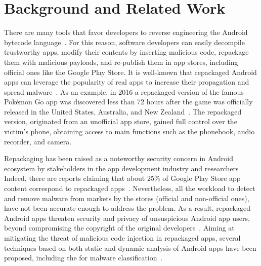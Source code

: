 \section{Background and Related Work}\label{sec:background}


There are many tools that favor developers to reverse engineering the Android bytecode language~\cite{DBLP:conf/issta/WangGMC15}.
For this reason, software developers can easily decompile trustworthy apps, modify their contents by inserting malicious code,
repackage them with malicious payloads, and re-publish them in app stores, including official ones like the Google Play Store.
It is well-known that repackaged Android apps can leverage the popularity of real apps to increase their propagation and spread malware~\cite{DBLP:journals/tse/LiBK21}. As an example, in 2016 a repackaged version of the famous Pokémon Go app was discovered less than 72 hours after the game was officially released in the United States, Australia, and New Zealand~\cite{DBLP:journals/tse/LiBK21}. The repackaged version, originated from an unofficial app store, gained full control over the victim's phone, obtaining access to main functions such as the phonebook, audio recorder, and camera.

Repackaging has been raised as a noteworthy security concern in Android ecosystem by stakeholders in the app development industry and researchers~\cite{DBLP:journals/ese/KhanmohammadiEH19}. Indeed, there are reports claiming that about 25\% of Google Play Store app content correspond to repackaged apps~\cite{DBLP:conf/sigmetrics/ViennotGN14}. Nevertheless, all the workload to detect and remove malware from markets by the stores (official and non-official ones), have not been accurate enough to address the problem. As a result, repackaged Android apps threaten security and privacy of unsuspicious Android app users, beyond compromising the copyright of the original developers~\cite{DBLP:journals/access/KimLCP19}. Aiming at
mitigating the threat of malicious code injection in repackaged apps,
several techniques based on both static and dynamic analysis of Android apps have been proposed,
including the \mas for malware classification~\cite{DBLP:conf/icse/JamrozikSZ16,DBLP:conf/wcre/BaoLL18}. 





